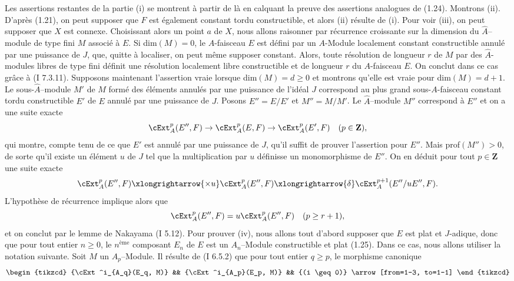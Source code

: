 Les assertions restantes de la partie (i) se montrent à partir de là en calquant la preuve des assertions analogues de (1.24). Montrons (ii). D'après (1.21), on peut supposer que $F$ est également constant tordu constructible, et alors (ii) résulte de (i). Pour voir (iii), on peut supposer que $X$ est connexe. Choisissant alors un point $a$ de $X$, nous allons raisonner par récurrence croissante sur la dimension du $\hat{A}$--module de type fini $M$ associé à $E$. Si dim$(M) = 0$, le $A$-faisceau $E$ est défini par un $A$-Module localement constant constructible annulé par une puissance de $J$, que, quitte à localiser, on peut même supposer constant. Alors, toute résolution de longueur $r$ de $M$ par des $\hat{A}$-modules libres de type fini définit une résolution localement libre constructible et de longueur $r$ du $A$-faisceau $E$. On conclut dans ce cas grâce à (I 7.3.11). Supposons maintenant l'assertion vraie lorsque dim$(M) = d \geq 0$ et montrons qu'elle est vraie pour dim$(M) = d+1$. Le sous-$\hat{A}$--module $M'$ de $M$ formé des éléments annulés par une puissance de l'idéal $J$ correspond au plus grand sous-$A$-faisceau constant tordu constructible $E'$ de $E$ annulé par une puissance de $J$. Posons $E'' = E/E'$ et $M'' = M/M'$. Le $\hat{A}$--module $M''$ correspond à $E''$ et on a une suite exacte
$$
\cExt^p_A(E'', F) \to \cExt^p_A(E, F) \to \cExt^p_A(E', F) \quad (p \in \mathbf{Z}),
$$
qui montre, compte tenu de ce que $E'$ est annulé par une puissance de $J$, qu'il suffit de prouver l'assertion pour $E''$. Mais prof$(M'') > 0$, de sorte qu'il existe un élément $u$ de $J$ tel que la multiplication par $u$ définisse un monomorphisme de $E''$. On en déduit pour tout $p \in \mathbf{Z}$ une suite exacte
$$
\cExt^p_A(E'', F) \xlongrightarrow{\times u} \cExt^p_A(E'', F) \xlongrightarrow{\delta} \cExt^{p+1}_A(E''/uE'', F).
$$
L'hypothèse de récurrence implique alors que 
$$
\cExt^p_A(E'', F) = u \cExt^p_A(E'', F) \quad (p \geq r+1),
$$
et on conclut par le lemme de Nakayama (I 5.12). Pour prouver (iv), nous allons tout d'abord supposer que $E$ est plat et $J$-adique, donc que pour tout entier $n \geq 0$, le $n^{\text{ème}}$ composant $E_n$ de $E$ est un $A_n$--Module constructible et plat (1.25). Dans ce cas, nous allons utiliser la notation suivante. Soit $M$ un $A_p$--Module. Il résulte de (I 6.5.2) que pour tout entier $q \geq p$, le morphisme canonique
\[\begin{tikzcd}
	{\cExt^i_{A_q}(E_q, M)} && {\cExt^i_{A_p}(E_p, M)} && {(i \geq 0)}
	\arrow[from=1-3, to=1-1]
\end{tikzcd}\]
